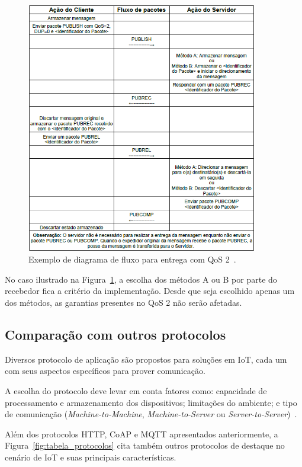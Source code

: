 \begin{figure}[ht]
	\centering
	\includegraphics[width=0.9\textwidth]{imagens/mqtt_qos2.png}
	\caption{Exemplo de diagrama de fluxo para entrega com QoS 2~\cite{mqttv3.1.1}.
		\label{fig:mqtt_qos2}}
\end{figure}
\FloatBarrier

No caso ilustrado na Figura~\ref{fig:mqtt_qos2}, a escolha dos métodos A ou B por parte do recebedor fica a critério da implementação. Desde que seja escolhido apenas um dos métodos, as garantias presentes no QoS 2 não serão afetadas.

\subsection{Comparação com outros protocolos}\label{sec:protocols}

Diversos protocolo de aplicação são propostos para soluções em IoT, cada um com seus aspectos específicos para prover comunicação.

A escolha do protocolo deve levar em conta fatores como: capacidade de processamento e armazenamento dos dispositivos; limitações do ambiente; e tipo de comunicação (\textit{Machine-to-Machine}, \textit{Machine-to-Server} ou \textit{Server-to-Server})~\cite{al2015toward}.

Além dos protocolos HTTP, CoAP e MQTT apresentados anteriormente, a Figura~\ref{fig:tabela_protocolos} cita também outros protocolos de destaque no cenário de IoT e suas principais características. 

